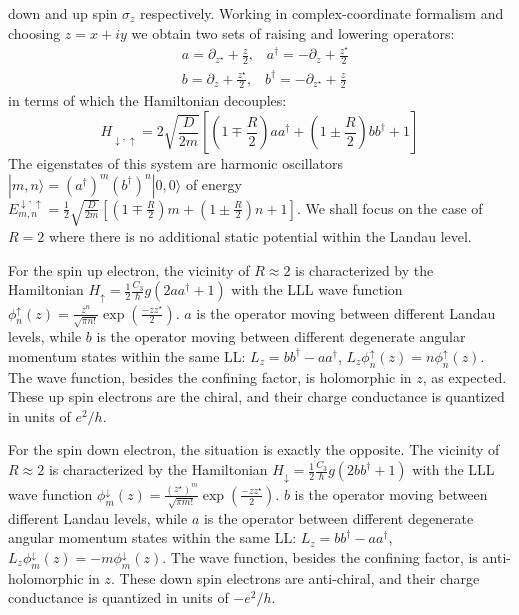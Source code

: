 \documentclass[prl,aps,amssymb,shownopacs,twocolumn]{revtex4}
\begin{document}
 down and up spin $\sigma_z$ respectively. Working in
complex-coordinate formalism and choosing $z = x+ i y$ we obtain two
sets of raising and lowering operators:
\begin{eqnarray}
& a = \partial_{z^\star} + \frac{z}{2}, \;\;\; a^\dagger = - \partial_z + \frac{z^\star}{2} \nonumber \\
& b = \partial_{z} + \frac{z^\star}{2}, \;\;\; b^\dagger = -
\partial_{z^\star} + \frac{z}{2}
\end{eqnarray}
\noindent in terms of which the Hamiltonian decouples:
\begin{equation}
H_{ \downarrow, \uparrow} =2 \sqrt{\frac{D}{2m}} \left[(1 \mp
\frac{R}{2} ) a a^\dagger + (1 \pm \frac{R}{2}) b b^\dagger  + 1
\right]
\end{equation}
\noindent The eigenstates of this system are harmonic oscillators
$|m,n\rangle = (a^\dagger)^m (b^\dagger)^n |0,0\rangle$ of energy
$E^{ \downarrow, \uparrow}_{m,n} = \frac{1}{2} \sqrt{\frac{D}{2m}}
\left[(1 \mp \frac{R}{2} ) m + (1 \pm \frac{R}{2}) n + 1 \right]$.
We shall focus on the case of $R=2$ where there is no additional
static potential within the Landau level.

For the spin up electron, the vicinity of $R \approx 2$ is
characterized by the Hamiltonian $H_{\uparrow} = \frac{1}{2}
\frac{C_3}{\hbar} g (2 a a^\dagger + 1) $ with the LLL wave function
$\phi^\uparrow_n(z) =\frac{z^n}{\sqrt{\pi n ! } }\exp(\frac{-z
z^\star}{2})$. $a$ is the operator moving between different Landau
levels, while $b$ is the operator moving between different
degenerate angular momentum states within the same LL: $L_z= b
b^\dagger - a a^\dagger$, $L_z \phi^\uparrow_n(z) =  n
\phi^\uparrow_n(z)$. The wave function, besides the confining
factor, is holomorphic in $z$, as expected. These up spin electrons
are the chiral, and their charge conductance is quantized in units
of $e^2/h$.


For the spin down electron, the situation is exactly the opposite.
The vicinity of $R \approx 2$ is characterized by the Hamiltonian
$H_{\downarrow} = \frac{1}{2} \frac{C_3}{\hbar} g (2 b b^\dagger +
1) $ with the LLL wave function $\phi^\downarrow_m(z)
=\frac{(z^\star)^m}{\sqrt{\pi m ! } }\exp(\frac{-z z^\star}{2})$.
$b$ is the operator moving between different Landau levels, while
$a$ is the operator between different degenerate angular momentum
states within the same LL: $L_z= b b^\dagger - a a^\dagger$, $L_z
\phi^\downarrow_m(z) = - m \phi^\downarrow_m(z)$. The wave function,
besides the confining factor, is anti-holomorphic in $z$. These down
spin electrons are anti-chiral, and their charge conductance is
quantized in units of $-e^2/h$.
\end{document}
